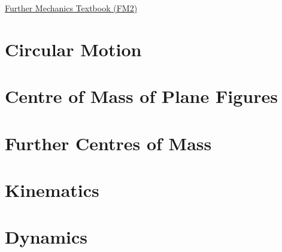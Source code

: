 \href{https://drive.google.com/drive/folders/1gXPjSqIhp6e2FcUWDM4XryDPhp6EqsRh}{\hypertarget{book:FM2}{Further Mechanics Textbook (FM2)}}

\section{Circular Motion} \label{circular_motions}
\newpage
\section{Centre of Mass of Plane Figures} \label{centre_of_mass_of_plane_figures}
\newpage
\section{Further Centres of Mass} \label{further_centres_of_mass}
\newpage
\section{Kinematics} \label{kinematics}
\newpage
\section{Dynamics} \label{dynamics}
\newpage